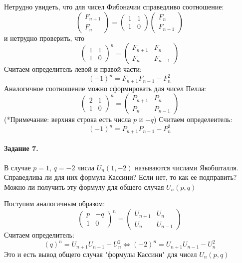 \documentclass[a4paper,12pt]{article}
\begin{document}
\begin{Solution}
Нетрудно увидеть, что для чисел Фибоначии справедливо соотношение:
\[
	\begin{pmatrix} F_{n+1} \\ F_{n} \end{pmatrix} = \begin{pmatrix} 1 & 1 \\ 1 & 0 \end{pmatrix} \begin{pmatrix} F_n \\ F_{n-1} \end{pmatrix}
\]
и нетрудно проверить, что
\[
	{\begin{pmatrix} 1 & 1 \\ 1 & 0 \end{pmatrix}}^n = \begin{pmatrix} F_{n+1} & F_n \\ F_n & F_{n-1} \end{pmatrix}
\]
Считаем определитель левой и правой части:
\[
	{\left(-1\right)}^n = F_{n+1}F_{n-1} - F_n^2
\]
Аналогичное соотношение можно сформировать для чисел Пелла:
\[
	{\begin{pmatrix} 2 & 1 \\ 1 & 0 \end{pmatrix}}^n = \begin{pmatrix} P_{n+1} & P_n \\ P_n & P_{n-1} \end{pmatrix}
\]
(*Примечание: верхняя строка есть числа $p$ и $-q$)
Считаем определеитель:
\[
	{\left(-1\right)}^n = P_{n+1}P_{n-1} - P_n^2
\]
\end{Solution}

\paragraph{Задание 7.} В случае $p=1$, $q=-2$ числа $U_n \left(1,-2\right)$ называются числами Якобшталля. Справедлива ли для них формула Кассини? Если нет, то как ее подправить? Можно ли получить эту формулу для общего случая $U_n \left(p,q\right)$

\begin{Solution}
Поступим аналогичным образом:
\[
	{\begin{pmatrix} p & -q \\ 1 & 0 \end{pmatrix}}^n = \begin{pmatrix} U_{n+1} & U_n \\ U_n & U_{n-1} \end{pmatrix}
\]
Считаем определитель:
\[
	{\left(q\right)}^n = U_{n+1}U_{n-1} - U_n^2 \Leftrightarrow {\left(-2\right)}^n = U_{n+1}U_{n-1} - U_n^2
\]
Это и есть вывод общего случая "формулы Кассини" для чисел $U_n\left(p,q\right)$
\end{Solution}
\end{document}
